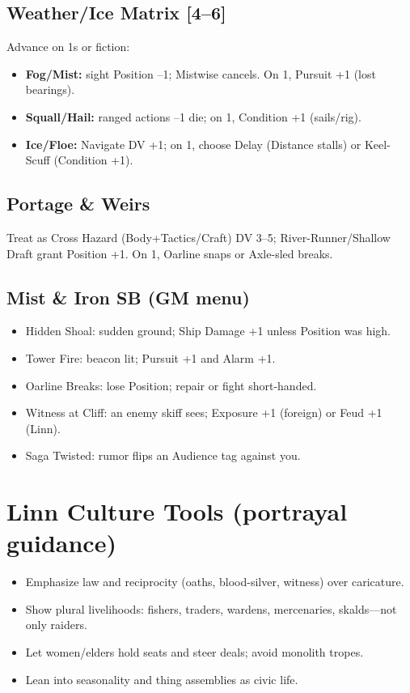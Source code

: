 \documentclass[11pt]{article}
\begin{document}
\subsection{Weather/Ice Matrix [4--6]}

Advance on 1s or fiction:
\begin{itemize}
\item \textbf{Fog/Mist:} sight Position --1; Mistwise cancels. On 1, Pursuit +1 (lost bearings).
\item \textbf{Squall/Hail:} ranged actions --1 die; on 1, Condition +1 (sails/rig).
\item \textbf{Ice/Floe:} Navigate DV +1; on 1, choose Delay (Distance stalls) or Keel-Scuff (Condition +1).
\end{itemize}

\subsection{Portage \& Weirs}

Treat as Cross Hazard (Body+Tactics/Craft) DV 3--5; River-Runner/Shallow Draft grant Position +1. On 1, Oarline snaps or Axle-sled breaks.

\subsection{Mist \& Iron SB (GM menu)}
\begin{itemize}
\item Hidden Shoal: sudden ground; Ship Damage +1 unless Position was high.
\item Tower Fire: beacon lit; Pursuit +1 and Alarm +1.
\item Oarline Breaks: lose Position; repair or fight short-handed.
\item Witness at Cliff: an enemy skiff sees; Exposure +1 (foreign) or Feud +1 (Linn).
\item Saga Twisted: rumor flips an Audience tag against you.
\end{itemize}

\section{Linn Culture Tools (portrayal guidance)}
\begin{itemize}
\item Emphasize law and reciprocity (oaths, blood-silver, witness) over caricature.
\item Show plural livelihoods: fishers, traders, wardens, mercenaries, skalds---not only raiders.
\item Let women/elders hold seats and steer deals; avoid monolith tropes.
\item Lean into seasonality and thing assemblies as civic life.
\end{itemize}
\end{document}
